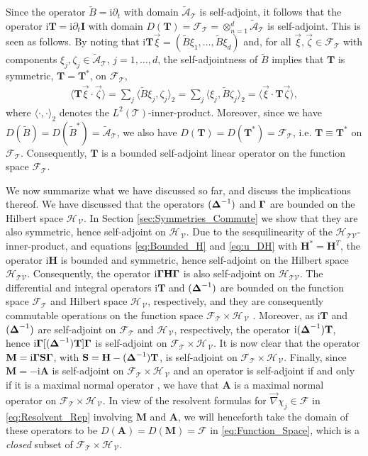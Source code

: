 \documentclass[11pt]{amsart}
\newcommand{\I}{\mathrm{i}}
\newcommand{\Mb}{\mathbf{M}}
\newcommand{\Tb}{\mathbf{T}}
\newcommand{\Hb}{\mathbf{H}}
\newcommand{\Ib}{\mathbf{I}}
\newcommand{\Sb}{\mathbf{S}}
\newcommand{\Ab}{\mathbf{A}}
\newcommand{\Tc}{\mathcal{T}}
\newcommand{\Vc}{\mathcal{V}}
\newcommand{\Hs}{\mathscr{H}}
\newcommand{\As}{\mathscr{A}}
\newcommand{\Fs}{\mathscr{F}}
\newcommand\bDelta{\mbox{\boldmath${\Delta}$}}
\newcommand\bGamma{\mbox{\boldmath${\Gamma}$}}
\begin{document}
Since the operator $\tilde{B}=\I\partial_t$ with domain $\tilde{\As}_{\Tc}$ is
self-adjoint, it follows that the operator $\I\Tb=\I\partial_t\Ib$ with domain
$D(\Tb)=\Fs_{\Tc}=\otimes_{n=1}^d\tilde{\As}_{\Tc}$ is self-adjoint. This is
seen as follows. By noting that
$\I\Tb\vec{\xi}=(\tilde{B}\xi_1,\ldots,\tilde{B}\xi_d)$ and, for all 
$\vec{\xi},\vec{\zeta}\in\Fs_{\Tc}$ with components
$\xi_j,\zeta_j\in\tilde{\As}_{\Tc}$, $j=1,\ldots,d$, the self-adjointness of 
$\tilde{B}$ implies that $\Tb$ is symmetric, $\Tb=\Tb^*$, on $\Fs_{\Tc}$, 
%
\begin{align}\label{eq:T_symmetric}
  \langle\Tb\vec{\xi}\cdot\vec{\zeta}\rangle=\sum_j\langle\tilde{B}\xi_j,\zeta_j\rangle_2
                    =\sum_j\langle\xi_j,\tilde{B}\zeta_j\rangle_2
                    =\langle\vec{\xi}\cdot\Tb\vec{\zeta}\rangle,
\end{align}
%
where $\langle\cdot,\cdot\rangle_2$ denotes the $L^2(\Tc)$-inner-product.  Moreover, since we have
$D(\tilde{B})=D(\tilde{B}^*)=\tilde{\As}_{\Tc}$, we also have
$D(\Tb)=D(\Tb^*)=\Fs_{\Tc}$, i.e. $\Tb\equiv\Tb^*$ on
$\Fs_{\Tc}$. Consequently, $\Tb$ is a bounded self-adjoint linear
operator on the function space $\Fs_{\Tc}$.



We now summarize what we have discussed so far, and
discuss the implications thereof. We have discussed that the 
operators $(\bDelta^{-1})$ and $\bGamma$ are bounded on the Hilbert
space $\Hs_{\,\Vc}$. In Section \ref{sec:Symmetries_Commute} we show
that they are also symmetric, hence self-adjoint on $\Hs_{\,\Vc}$. Due
to the sesquilinearity of the $\Hs_{\Tc\Vc}$-inner-product, and
equations \eqref{eq:Bounded_H} and \eqref{eq:u_DH} with $\Hb^*=\Hb^T$,
the  operator $\I\Hb$ is bounded and symmetric, hence self-adjoint on
the Hilbert space $\Hs_{\Tc\Vc}$.  Consequently, the operator
$\I\bGamma\Hb\bGamma$ is also self-adjoint on $\Hs_{\Tc\Vc}$. The
differential and integral operators $\I\Tb$ and $(\bDelta^{-1})$ are 
bounded on the function space $\Fs_{\Tc}$ and Hilbert space $\Hs_{\,\Vc}$,
respectively, and they are consequently commutable operations on the
function space $\Fs_{\Tc}\times\Hs_{\,\Vc}$ \cite{Folland:99}. Moreover, as
$\I\Tb$ and $(\bDelta^{-1})$ are self-adjoint on
$\Fs_{\Tc}$ and $\Hs_{\,\Vc}$, respectively, the operator 
$\I(\bDelta^{-1})\Tb$, hence $\I\bGamma[(\bDelta^{-1})\Tb]\bGamma$ is
self-adjoint on $\Fs_{\Tc}\times\Hs_{\,\Vc}$. It is now clear that the operator
$\Mb=\I\bGamma\Sb\bGamma$, with $\Sb=\Hb-(\bDelta^{-1})\Tb$, is
self-adjoint on $\Fs_{\Tc}\times\Hs_{\,\Vc}$. Finally, since $\Mb=-\I\Ab$ is
self-adjoint on $\Fs_{\Tc}\times\Hs_{\,\Vc}$ and an operator is
self-adjoint if and only if it is a maximal normal operator
\cite{Stone:64}, we have that $\Ab$ is a maximal normal
operator on $\Fs_{\Tc}\times\Hs_{\,\Vc}$. In view of the resolvent
formulas for $\vec{\nabla}\chi_j\in\Fs$ in \eqref{eq:Resolvent_Rep}
involving $\Mb$ and $\Ab$, we will henceforth take the domain of
these operators to be $D(\Ab)=D(\Mb)=\Fs$ in
\eqref{eq:Function_Space}, which is a \emph{closed} subset of
$\Fs_{\Tc}\times\Hs_{\,\Vc}$.   
\end{document}
